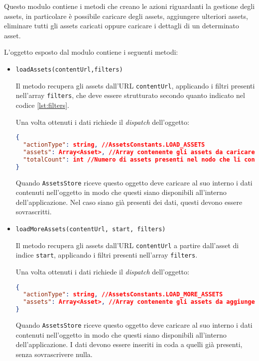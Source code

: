 
Questo modulo contiene i metodi che creano le azioni riguardanti la gestione degli assets, in particolare è possibile caricare degli assets, aggiungere ulteriori assets, eliminare tutti gli assets caricati oppure caricare i dettagli di un determinato asset.

L'oggetto esposto dal modulo contiene i seguenti metodi:
\begin{itemize}
\item \texttt{loadAssets(contentUrl,filters)}

Il metodo recupera gli assets dall'URL \texttt{contentUrl}, applicando i filtri presenti nell'array \texttt{filters}, che deve essere strutturato secondo quanto indicato nel codice \ref{lst:filters}.

Una volta ottenuti i dati richiede il \textit{dispatch} dell'oggetto:
\begin{lstlisting}[language=JSON, caption=Action - load assets]
{
  "actionType": string, //AssetsConstants.LOAD_ASSETS
  "assets": Array<Asset>, //Array contenente gli assets da caricare
  "totalCount": int //Numero di assets presenti nel nodo che li contiene
}
\end{lstlisting}

Quando \texttt{AssetsStore} riceve questo oggetto deve caricare al suo interno i dati contenuti nell'oggetto in modo che questi siano disponibili all'interno dell'applicazione. Nel caso siano già presenti dei dati, questi devono essere sovrascritti.

\item \texttt{loadMoreAssets(contentUrl, start, filters)}

Il metodo recupera gli assets dall'URL \texttt{contentUrl} a partire dall'asset di indice \texttt{start}, applicando i filtri presenti nell'array \texttt{filters}.

Una volta ottenuti i dati richiede il \textit{dispatch} dell'oggetto:
\begin{lstlisting}[language=JSON, caption=Action - load more assets]
{
  "actionType": string, //AssetsConstants.LOAD_MORE_ASSETS
  "assets": Array<Asset>, //Array contenente gli assets da aggiungere in coda agli assets attuali
}
\end{lstlisting}

Quando \texttt{AssetsStore} riceve questo oggetto deve caricare al suo interno i dati contenuti nell'oggetto in modo che questi siano disponibili all'interno dell'applicazione.
I dati devono essere inseriti in coda a quelli già presenti, senza sovrascrivere nulla.


\end{itemize}
